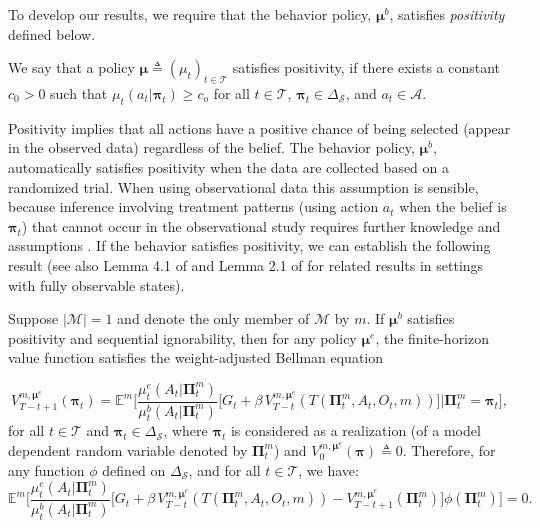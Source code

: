 \documentclass[opre,nonblindrev]{informs2}%
\newcommand{\teq}{\triangleq}
\newcommand{\1}{\hbox{\rm 1\kern-.35em 1}}
\newcommand{\E}{\mathbb E}
\newcommand{\MS}{\mathscr S}
\newcommand{\MA}{\mathscr A}
\newcommand{\MT}{\mathscr T}
\newcommand{\MM}{\mathscr M}
\newcommand{\bpi}{\boldsymbol{\pi}}
\newcommand{\bPi}{\boldsymbol{\Pi}}
\newcommand{\bmu}{\boldsymbol{\mu}}
\begin{document}
To develop our results, we require that the behavior policy, $\bmu^b$, satisfies {\em positivity} defined below.


\begin{definition}
We say that a policy $\bmu\teq (\mu_t)_{t\in\MT}$ satisfies positivity, if  there exists a constant $c_0>0$ such that $\mu_t (a_t| \bpi_t)\geq c_o$ for all $t\in\MT$,  $\bpi_t\in\Delta_\MS$, and $a_t\in\MA$.
\end{definition}

Positivity implies that  all actions have a positive chance of being selected (appear in the observed data) regardless of the belief.  The behavior policy, $\bmu^b$, automatically satisfies  positivity  when the data are collected based on a randomized trial. When using observational data this assumption is  sensible, because  inference involving treatment patterns (using action $a_t$ when the belief is $\bpi_t$)  that cannot occur in the observational study requires further knowledge and assumptions \citep{Murphy2001}. If the behavior satisfies positivity, we can establish the following result (see also Lemma 4.1 of  \cite{Murphy2001} and  Lemma 2.1 of \cite{Luckett2020} for related results in settings with fully observable states).

\begin{proposition}\label{prop:POMDPest}
Suppose $|\MM|=1$ and denote the only member of $\MM$ by $m$. If $\bmu^b$ satisfies positivity and sequential ignorability, then for any policy $\bmu^e$, the finite-horizon value function satisfies the weight-adjusted Bellman equation

\begin{equation}\label{eq:POMDPest1}
V_{T-t+1}^{m,\bmu^e} (\bpi_t)= \E^m \bigg[\frac{\mu_t^e(A_t|\bPi^m_t)}{\mu_t^b(A_t|\bPi^m_t)}\Big[G_t+ \beta\, V_{T-t}^{m,\bmu^e}  (T(\bPi^m_t, A_t, O_t, m))\Big]\Big| \bPi^m_t=\bpi_t \bigg],
\end{equation}
for all $t\in\MT$ and $\bpi_t\in\Delta_\MS$, where $\bpi_t$ is considered as a realization (of a model dependent random variable denoted by $\bPi^m_t$) and $V_{0}^{m,\bmu^e} (\bpi)\teq 0$. Therefore, for any function $\phi$ defined on $\Delta_\MS$, and for all $t\in\MT$, we have:
\begin{equation} \label{eq:POMDPest2}
\E^m \bigg[ \frac{\mu_t^e(A_t|\bPi^m_t)}{\mu_t^b(A_t|\bPi^m_t)}\Big[G_t+ \beta\, V_{T-t}^{m,\bmu^e}  (T(\bPi^m_t, A_t, O_t, m))- V_{T-t+1}^{m,\bmu^e} (\bPi^m_t)\Big] \phi (\bPi^m_t)\bigg]=0.
\end{equation}
\end{proposition}
\end{document}
